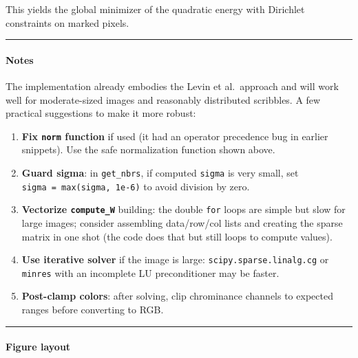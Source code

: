 \documentclass[11pt]{article}
\providecommand{\tightlist}{%
      \setlength{\itemsep}{0pt}\setlength{\parskip}{0pt}}
\begin{document}
This yields the global minimizer of the quadratic energy with Dirichlet
constraints on marked pixels.

\begin{center}\rule{0.5\linewidth}{0.5pt}\end{center}

\hypertarget{notes}{%
\paragraph{\texorpdfstring{\textbf{Notes}}{Notes}}\label{notes}}

The implementation already embodies the Levin et al.~approach and will
work well for moderate-sized images and reasonably distributed
scribbles. A few practical suggestions to make it more robust:

\begin{enumerate}
\def\labelenumi{\arabic{enumi}.}
\tightlist
\item
  \textbf{Fix \texttt{norm} function} if used (it had an operator
  precedence bug in earlier snippets). Use the safe normalization
  function shown above.
\item
  \textbf{Guard sigma}: in \texttt{get\_nbrs}, if computed
  \texttt{sigma} is very small, set \texttt{sigma\ =\ max(sigma,\ 1e-6)}
  to avoid division by zero.
\item
  \textbf{Vectorize \texttt{compute\_W}} building: the double
  \texttt{for} loops are simple but slow for large images; consider
  assembling data/row/col lists and creating the sparse matrix in one
  shot (the code does that but still loops to compute values).
\item
  \textbf{Use iterative solver} if the image is large:
  \texttt{scipy.sparse.linalg.cg} or \texttt{minres} with an incomplete
  LU preconditioner may be faster.
\item
  \textbf{Post-clamp colors}: after solving, clip chrominance channels
  to expected ranges before converting to RGB.
\end{enumerate}

\begin{center}\rule{0.5\linewidth}{0.5pt}\end{center}

\hypertarget{figure-layout}{%
\paragraph{\texorpdfstring{\textbf{Figure
layout}}{Figure layout}}\label{figure-layout}}
\end{document}

